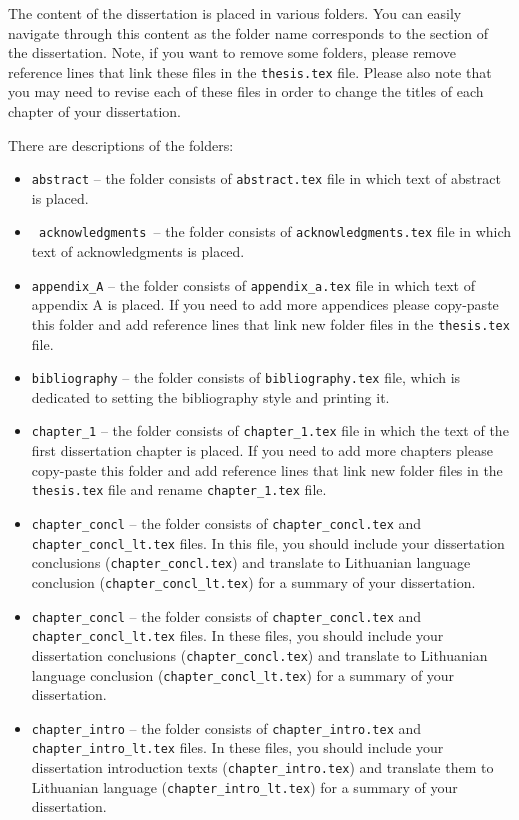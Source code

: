 The content of the dissertation is placed in various folders. You can easily navigate through this content as the folder name corresponds to the section of the dissertation. Note, if you want to remove some folders, please remove reference lines that link these files in the \verb|thesis.tex| file. Please also note that you may need to revise each of these files in order to change the titles of each chapter of your dissertation.

There are descriptions of the folders:
\begin{itemize}
    \item \verb|abstract| -- the folder consists of \verb|abstract.tex| file in which text of abstract is placed.
    \item \verb| acknowledgments |-- the folder consists of \verb|acknowledgments.tex| file in which text of acknowledgments is placed.
    \item \verb|appendix_A| -- the folder consists of \verb|appendix_a.tex| file in which text of appendix A is placed. If you need to add more appendices please copy-paste this folder and add reference lines that link new folder files in the \verb|thesis.tex| file.
    \item \verb|bibliography| -- the folder consists of \verb|bibliography.tex| file, which is dedicated to setting the bibliography style and printing it.
    \item \verb|chapter_1| -- the folder consists of \verb|chapter_1.tex| file in which the text of the first dissertation chapter is placed. If you need to add more chapters please copy-paste this folder and add reference lines that link new folder files in the \verb|thesis.tex| file and rename \verb|chapter_1.tex| file.
    \item \verb|chapter_concl| -- the folder consists of \verb|chapter_concl.tex| and \verb|chapter_concl_lt.tex| files. In this file, you should include your dissertation conclusions (\verb|chapter_concl.tex|)  and translate to Lithuanian language conclusion (\verb|chapter_concl_lt.tex|) for a summary of your dissertation.
    \item \verb|chapter_concl| -- the folder consists of \verb|chapter_concl.tex| and \verb|chapter_concl_lt.tex| files. In these files, you should include your dissertation conclusions (\verb|chapter_concl.tex|)  and translate to Lithuanian language conclusion (\verb|chapter_concl_lt.tex|) for a summary of your dissertation.
    \item \verb|chapter_intro| -- the folder consists of \verb|chapter_intro.tex| and \verb|chapter_intro_lt.tex| files. In these files, you should include your dissertation introduction texts (\verb|chapter_intro.tex|) and translate them to Lithuanian language (\verb|chapter_intro_lt.tex|) for a summary of your dissertation.

\end{itemize}
